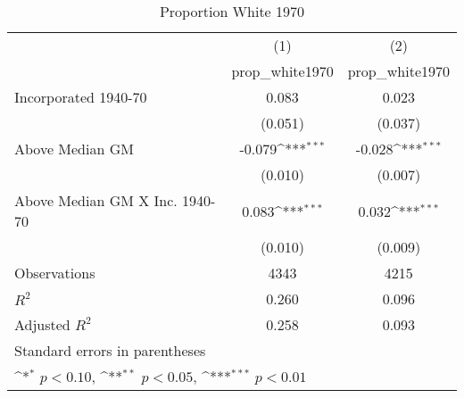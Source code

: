 \begin{table}[htbp]\centering
\def\sym#1{\ifmmode^{#1}\else\(^{#1}\)\fi}
\caption{Proportion White 1970}
\begin{tabular}{l*{2}{c}}
\hline\hline
                    &\multicolumn{1}{c}{(1)}&\multicolumn{1}{c}{(2)}\\
                    &\multicolumn{1}{c}{prop\_white1970}&\multicolumn{1}{c}{prop\_white1970}\\
\hline
Incorporated 1940-70&       0.083         &       0.023         \\
                    &     (0.051)         &     (0.037)         \\
[1em]
Above Median GM     &      -0.079\sym{***}&      -0.028\sym{***}\\
                    &     (0.010)         &     (0.007)         \\
[1em]
Above Median GM X Inc. 1940-70&       0.083\sym{***}&       0.032\sym{***}\\
                    &     (0.010)         &     (0.009)         \\
\hline
Observations        &        4343         &        4215         \\
\(R^{2}\)           &       0.260         &       0.096         \\
Adjusted \(R^{2}\)  &       0.258         &       0.093         \\
\hline\hline
\multicolumn{3}{l}{\footnotesize Standard errors in parentheses}\\
\multicolumn{3}{l}{\footnotesize \sym{*} \(p<0.10\), \sym{**} \(p<0.05\), \sym{***} \(p<0.01\)}\\
\end{tabular}
\end{table}
